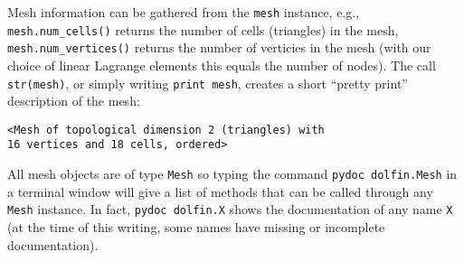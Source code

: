 Mesh information can be gathered from the {\fontsize{12pt}{12pt}\verb!mesh!} instance, e.g.,
{\fontsize{12pt}{12pt}\verb!mesh.num_cells()!} returns the number of cells (triangles) in
the mesh, {\fontsize{12pt}{12pt}\verb!mesh.num_vertices()!} returns the number of verticies
in the mesh (with our choice of linear Lagrange elements this equals
the number of nodes). The call {\fontsize{12pt}{12pt}\verb!str(mesh)!}, or simply writing 
{\fontsize{12pt}{12pt}\texttt{print mesh}},
creates a short ``pretty print''
description of the mesh:
\begin{Verbatim}[fontsize=\fontsize{10pt}{10pt},tabsize=8,baselinestretch=1.05,
fontfamily=tt,xleftmargin=7mm]
<Mesh of topological dimension 2 (triangles) with 
16 vertices and 18 cells, ordered>
\end{Verbatim}
\noindent
All mesh objects are of type {\fontsize{12pt}{12pt}\texttt{Mesh}} so typing the command
{\fontsize{12pt}{12pt}\texttt{pydoc dolfin.Mesh}} in a terminal window
will give a list of methods that can be called through any
{\fontsize{12pt}{12pt}\texttt{Mesh}} instance. In fact, {\fontsize{12pt}{12pt}\texttt{pydoc dolfin.X}} shows the
documentation of
any \dolfin{} name {\fontsize{12pt}{12pt}\texttt{X}} (at the time of this writing, some names
have missing or incomplete documentation).


